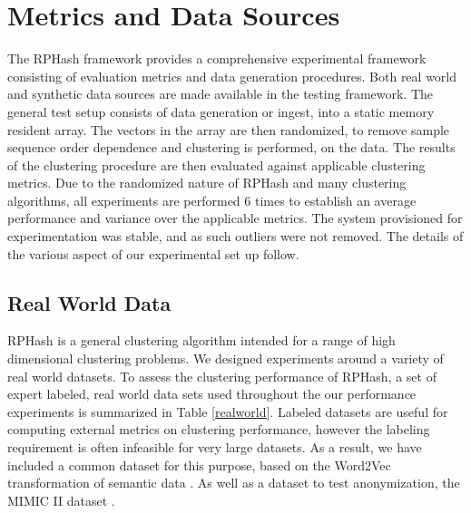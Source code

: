 
\section{Metrics and Data Sources}

The \textsf{RPHash} framework provides a comprehensive experimental framework consisting of evaluation metrics
and data generation procedures.  Both real world and synthetic data sources are made available in
the testing framework.  The general test setup consists of data generation or ingest, into a static
memory resident array.  The vectors in the array are then randomized, to remove sample sequence
order dependence and clustering is performed, on the data.  The results of the clustering procedure
are then evaluated against applicable clustering metrics.  Due to the randomized nature of \textsf{RPHash}
and many clustering algorithms, all experiments are performed 6 times to establish an average
performance and variance over the applicable metrics.  The system provisioned for experimentation
was stable, and as such outliers were not removed.  The details of the various aspect of our
experimental set up follow.

\subsection{Real World Data}

\textsf{RPHash} is a general clustering algorithm intended for a range of high dimensional clustering
problems.  We designed experiments around a variety of real world datasets.  To assess the
clustering performance of \textsf{RPHash}, a set of expert labeled, real world data sets used throughout the
our performance experiments is summarized in Table \ref{realworld}.  Labeled datasets are useful
for computing external metrics on clustering performance, however the labeling requirement is often
infeasible for very large datasets.  As a result, we have included a common dataset for this
purpose, based on the Word2Vec transformation of semantic data \cite{word2vec}.  As well as a
dataset to test anonymization, the MIMIC II dataset \cite{MIMICII}.


